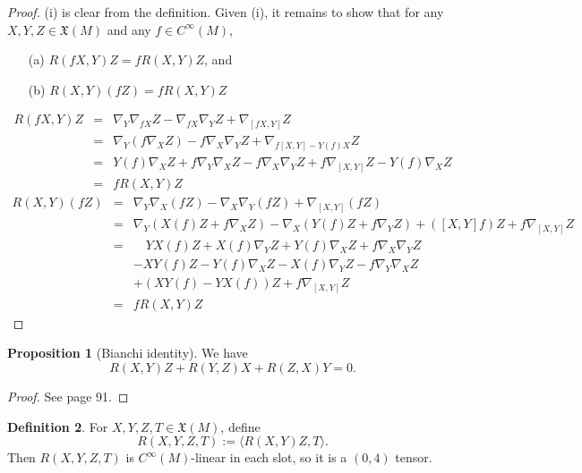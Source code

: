 \documentclass{amsart}
\numberwithin{equation}{section}
\newcommand{\fX}{\mathfrak{X}}
\theoremstyle{definition}
\newtheorem{definition}{Definition} [section]
\theoremstyle{theorem}
\newtheorem{proposition}[definition]{Proposition}
\begin{document}
\begin{proof} (i) is clear from the definition. Given (i), it remains to show that
for any $X,Y,Z\in \fX(M)$ and any $f\in C^\infty(M)$, 
\begin{enumerate}
\item[(a)] $R(fX,Y)Z = fR(X,Y)Z$, and 
\item[(b)] $R(X,Y)(fZ)=fR(X,Y)Z$ 
\end{enumerate}
\begin{eqnarray*}
R(fX,Y)Z & =& \nabla_Y\nabla_{fX}Z -\nabla_{fX}\nabla_Y Z +\nabla_{[fX,Y]} Z\\
&=& \nabla_Y (f\nabla_X Z)-f\nabla_X \nabla_Y Z + \nabla_{f[X,Y]-Y(f)X} Z\\
&=& Y(f) \nabla_X Z + f\nabla_Y\nabla_X Z -f\nabla_X \nabla_Y Z + f\nabla_{[X,Y]}Z -Y(f)\nabla_X Z\\
&=&  fR(X,Y)Z
\end{eqnarray*} 
\begin{eqnarray*}
R(X,Y)(fZ)&=& \nabla_Y\nabla_X(fZ) -\nabla_X\nabla_Y(fZ) +\nabla_{[X,Y]} (fZ)\\
&=& \nabla_Y (X(f) Z+ f\nabla_X Z) - \nabla_X (Y(f) Z+ f\nabla_Y Z) + ([X,Y]f)Z + f\nabla_{[X,Y]} Z\\
&=& \quad YX(f) Z + X(f)\nabla_Y Z + Y(f)\nabla_X Z + f\nabla_X\nabla_Y Z\\
&&    -XY(f) Z - Y(f)\nabla_X Z - X(f)\nabla_Y Z - f\nabla_Y\nabla_X Z \\
&&     + (XY(f)-YX(f))Z  + f\nabla_{[X,Y]} Z\\
&=&  fR(X,Y)Z
\end{eqnarray*}
\end{proof}

\begin{proposition}[Bianchi identity]
We have 
\[
R(X,Y)Z + R(Y,Z)X + R(Z,X)Y = 0.
\]
\end{proposition}

\begin{proof} See \cite{dC} page 91.
\end{proof}

\begin{definition}
For $X,Y,Z,T \in \mathfrak{X}(M)$, define 
\[
R(X,Y,Z,T) := \langle R(X,Y)Z, T \rangle. 
\]
Then $R(X,Y,Z,T)$ is $C^\infty(M)$-linear in each slot, so it is a $(0,4)$ tensor. 
\end{definition}
\end{document}
